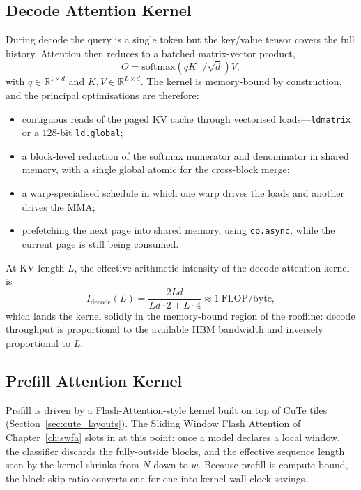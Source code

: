 \subsection{Decode Attention Kernel}\label{sec:sglang_decode}
During decode the query is a single token but the key/value
tensor covers the full history. Attention then reduces to a
batched matrix-vector product,
\[
    O = \mathrm{softmax}\!\left(q K^{\!\top} / \sqrt{d}\right) V,
\]
with $q \in \mathbb{R}^{1 \times d}$ and $K, V \in \mathbb{R}^{L
\times d}$. The kernel is memory-bound by construction, and the
principal optimisations are therefore:
\begin{itemize}
    \item contiguous reads of the paged KV cache through
          vectorised loads---\texttt{ldmatrix} or a $128$-bit
          \texttt{ld.global};
    \item a block-level reduction of the softmax numerator and
          denominator in shared memory, with a single global
          atomic for the cross-block merge;
    \item a warp-specialised schedule in which one warp drives
          the loads and another drives the MMA;
    \item prefetching the next page into shared memory, using
          \texttt{cp.async}, while the current page is still
          being consumed.
\end{itemize}
At KV length $L$, the effective arithmetic intensity of the
decode attention kernel is
\begin{equation}
    I_{\text{decode}}(L) = \frac{2 L d}{L d \cdot 2 + L \cdot 4}
                         \approx 1\ \text{FLOP/byte},
\end{equation}
which lands the kernel solidly in the memory-bound region of the
roofline: decode throughput is proportional to the available HBM
bandwidth and inversely proportional to $L$.

\subsection{Prefill Attention Kernel}\label{sec:sglang_prefill}
Prefill is driven by a Flash-Attention-style kernel built on top
of CuTe tiles (Section~\ref{sec:cute_layouts}). The Sliding
Window Flash Attention of Chapter~\ref{ch:swfa} slots in at this
point: once a model declares a local window, the classifier
discards the fully-outside blocks, and the effective sequence
length seen by the kernel shrinks from $N$ down to $w$. Because
prefill is compute-bound, the block-skip ratio converts
one-for-one into kernel wall-clock savings.


